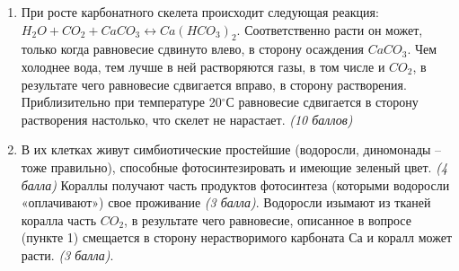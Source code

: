 \solutionSection
\begin{enumerate}
\item При росте карбонатного скелета происходит следующая реакция:\\
$H_2O+CO_2+CaCO_3 \leftrightarrow Ca(HCO_3)_2$. Соответственно расти он может, только когда равновесие сдвинуто влево, в сторону осаждения $CaCO_3$. Чем холоднее вода, тем лучше в ней растворяются газы, в том числе и $CO_2$, в результате чего равновесие сдвигается вправо, в сторону растворения. Приблизительно при температуре 20$^{\circ}$С равновесие сдвигается в сторону растворения настолько, что скелет не нарастает. \textit{(10 баллов)}
\item В их клетках живут симбиотические простейшие (водоросли, диномонады – тоже правильно), способные фотосинтезировать и имеющие зеленый цвет. \textit{(4 балла)} Кораллы получают часть продуктов фотосинтеза (которыми водоросли «оплачивают») свое проживание \textit{(3 балла)}. Водоросли изымают из тканей коралла часть $CO_2$, в результате чего равновесие, описанное в вопросе (пункте 1) смещается в сторону нерастворимого карбоната $Са$ и коралл может расти. \textit{(3 балла)}.
\end{enumerate}